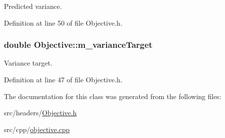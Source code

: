Predicted variance. 



Definition at line 50 of file Objective.\+h.

\subsubsection[{\texorpdfstring{m\+\_\+variance\+Target}{m_varianceTarget}}]{\setlength{\rightskip}{0pt plus 5cm}double Objective\+::m\+\_\+variance\+Target\hspace{0.3cm}{\ttfamily [private]}}\hypertarget{classObjective_a7344fafbba4c5c3aa51b3fea7f209e32}{}\label{classObjective_a7344fafbba4c5c3aa51b3fea7f209e32}


Variance target. 



Definition at line 47 of file Objective.\+h.



The documentation for this class was generated from the following files\+:\begin{DoxyCompactItemize}
\item 
src/headers/\hyperlink{Objective_8h}{Objective.\+h}\item 
src/cpp/\hyperlink{objective_8cpp}{objective.\+cpp}\end{DoxyCompactItemize}
